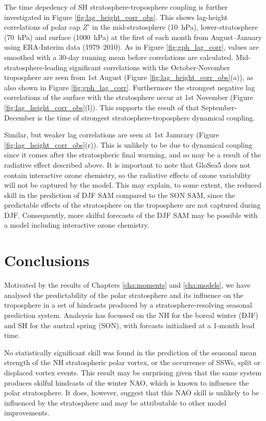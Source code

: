 The time depedency of SH stratosphere-troposphere coupling is further
investigated in Figure \ref{fig:lag_height_corr_obs}. This shows lag-height
correlations of polar cap $Z'$ in the mid-stratosphere (10~hPa),
lower-stratosphere (70~hPa) and surface (1000~hPa) at the first of each month
from August--January using ERA-Interim data (1979--2010). As in Figure
\ref{fig:gph_lag_corr}, values are smoothed with a 30-day running mean before
correlations are calculated. Mid-stratosphere-leading significant correlations
with the October-November troposphere are seen from 1st August (Figure
\ref{fig:lag_height_corr_obs}(a)), as also shown in Figure
\ref{fig:gph_lag_corr}. Furthermore the strongest negative lag correlations of
the surface with the stratosphere occur at 1st November (Figure
\ref{fig:lag_height_corr_obs}(l)). This supports the result of
\citet{Shaw2010} that September-December is the time of strongest
stratosphere-troposphere dynamical coupling. 

Similar, but weaker lag correlations are seen at 1st Janurary (Figure
\ref{fig:lag_height_corr_obs}(r)). This is unlikely to be due to dynamical
coupling since it comes after the stratospheric final warming, and so may be a
result of the radiative effect described above. It is important to note that
GloSea5 does not contain interactive ozone chemistry, so the radiative effects
of ozone variability will not be captured by the model. This may explain, to
some extent, the reduced skill in the prediction of DJF SAM compared to the SON
SAM, since the predictable effects of the stratosphere on the troposphere are
not captured during DJF. Consequently, more skilful forecasts of the DJF SAM may
be possible with a model including interactive ozone chemistry. 



\section{Conclusions}
\label{sec:seas-conclusions}

Motivated by the results of Chapters \ref{cha:moments} and \ref{cha:models}, we
have analysed the predictability of the polar stratosphere and its influence on
the troposphere in a set of hindcasts produced by a stratosphere-resolving
seasonal prediction system. Analsysis has focussed on the NH for the boreal
winter (DJF) and SH for the austral spring (SON), with forcasts initialised at a
1-month lead time.

No statistically significant skill was found in the prediction of the seasonal
mean strength of the NH stratospheric polar vortex, or the occurrence of SSWs,
split or displaced vortex events. This result may be surprising given that the
same system produces skilful hindcasts of the winter NAO, which is known to
influence the polar stratosphere. It does, however, suggest that this NAO skill
is unlikely to be influenced by the stratosphere and may be attributable to
other model improvements.

